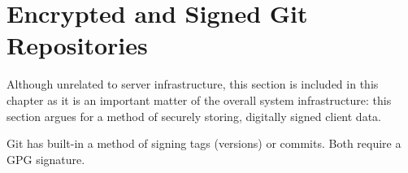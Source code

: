 
\section{Encrypted and Signed Git Repositories}

Although unrelated to server infrastructure, this section is included in this
chapter as it is an important matter of the overall system infrastructure: this
section argues for a method of securely storing, digitally signed client data.

Git has built-in a method of signing tags (versions) or commits. Both require a
GPG signature.

